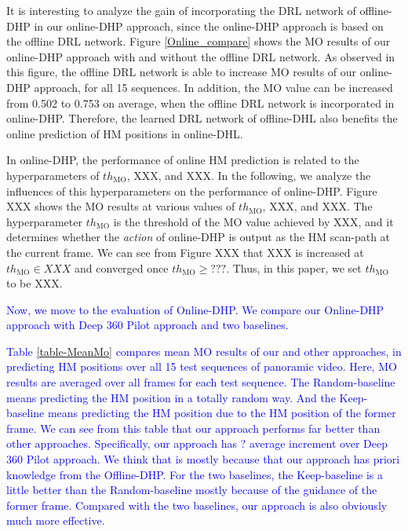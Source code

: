 \documentclass[10pt,journal,compsoc]{IEEEtran}
\begin{document}
It is interesting to analyze the gain of incorporating the DRL network of offline-DHP in our online-DHP approach, since the online-DHP approach is based on the offline DRL network. Figure \ref{Online_compare} shows the MO results of our online-DHP approach with and without the offline DRL network. As observed in this figure, the offline DRL network is able to increase MO results of our online-DHP approach, for all 15 sequences. In addition, the MO value can be increased from 0.502 to 0.753 on average, when the offline DRL network is incorporated in online-DHP. Therefore, the learned DRL network of offline-DHL also benefits the online prediction of HM positions in online-DHL.

In online-DHP, the performance of online HM prediction is related to the hyperparameters of $th_{\text{MO}}$, XXX, and XXX. In the following, we analyze the influences of this hyperparameters on the performance of online-DHP. Figure XXX shows the MO results at various values of $th_{\text{MO}}$, XXX, and XXX. The hyperparameter $th_{\text{MO}}$ is the threshold of the MO value achieved by XXX, and it determines whether the \textit{action} of online-DHP is output as the HM scan-path at the current frame. We can see from Figure XXX that XXX is increased at $th_{\text{MO}}\in XXX$ and converged once $th_{\text{MO}}\geq???$. Thus, in this paper, we set $th_{\text{MO}}$ to be XXX.


\textcolor{blue}{Now, we move to the evaluation of Online-DHP. We compare our Online-DHP approach with Deep 360 Pilot approach\cite{hu2017deep} and two baselines.}

\textcolor{blue}{Table \ref{table-MeanMo} compares mean MO results of our and other approaches, in predicting HM positions over all 15 test sequences of panoramic video.
Here, MO results are averaged over all frames for each test sequence.
The Random-baseline means predicting the HM position in a totally random way.
And the Keep-baseline means predicting the HM position due to the HM position of the former frame.
We can see from this table that our approach performs far better than other approaches. Specifically, our approach has ? average increment over Deep 360 Pilot approach\cite{hu2017deep}.
We think that is mostly because that our approach has priori knowledge from the Offline-DHP.
For the two baselines, the Keep-baseline is a little better than the Random-baseline mostly because of the guidance of the former frame.
Compared with the two baselines, our approach is also obviously much more effective.}
\end{document}
